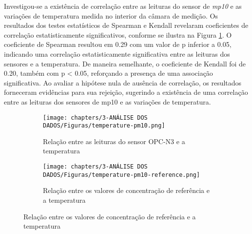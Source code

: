 Investigou-se a existência de correlação entre as leituras do sensor de \textit{mp10} e as variações de temperatura medida no interior da câmara de medição. Os resultados dos testes estatísticos de Spearman e Kendall revelaram coeficientes de correlação estatisticamente significativos, conforme se ilustra na Figura \ref{fig:data-temp-pm10-corr}. O coeficiente de Spearman resultou em 0.29 com um valor de p inferior a 0.05, indicando uma correlação estatisticamente significativa entre as leituras dos sensores e a temperatura. De maneira semelhante, o coeficiente de Kendall foi de 0.20, também com p < 0.05, reforçando a presença de uma associação significativa. Ao avaliar a hipótese nula de ausência de correlação, os resultados forneceram evidências para sua rejeição, sugerindo a existência de uma correlação entre as leituras dos sensores de \acrshort{mp10} e as variações de temperatura.

\begin{figure}[h]
    \centering
    \caption{Relação dos dados de concentração de \acrshort{mp10} com a temperatura}
    \begin{subfigure}{0.4\textwidth}
        \texttt{[image: chapters/3-ANÁLISE DOS DADOS/Figuras/temperature-pm10.png]}
        \caption{Relação entre as leituras do sensor OPC-N3 e a temperatura}
        \label{fig:data-temp-pm10-corr}
    \end{subfigure}
    \hfill
    \begin{subfigure}{0.4\textwidth}
        \texttt{[image: chapters/3-ANÁLISE DOS DADOS/Figuras/temperature-pm10-reference.png]}
        \caption{Relação entre os valores de concentração de referência e a temperatura}
        \label{fig:data-temp-pm10-ref-corr}
    \end{subfigure}
    \hfill
    \label{fig:data-pm10-temp}
\end{figure}

